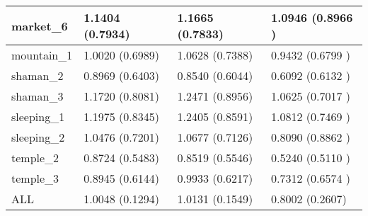 \documentclass[journal]{IEEEtran}
\begin{document}
\begin{table}
\begin{center}
\begin{tabular}{|l|l|l|l|}
\hline
market\_6 & 1.1404 \scriptsize(0.7934)& 1.1665 \scriptsize(0.7833) & 1.0946 \scriptsize(0.8966 )\\
\hline
mountain\_1 & 1.0020 \scriptsize(0.6989)& 1.0628 \scriptsize(0.7388)& 0.9432 \scriptsize(0.6799 ) \\
\hline
shaman\_2 & 0.8969 \scriptsize(0.6403)& 0.8540 \scriptsize(0.6044)& 0.6092 \scriptsize(0.6132 ) \\
\hline
shaman\_3 & 1.1720 \scriptsize(0.8081)& 1.2471 \scriptsize(0.8956)& 1.0625 \scriptsize(0.7017 ) \\
\hline
sleeping\_1 & 1.1975 \scriptsize(0.8345)& 1.2405 \scriptsize(0.8591)& 1.0812 \scriptsize(0.7469 ) \\
\hline
sleeping\_2 & 1.0476 \scriptsize(0.7201)& 1.0677 \scriptsize(0.7126)& 0.8090 \scriptsize(0.8862 ) \\
\hline
temple\_2 & 0.8724 \scriptsize(0.5483)& 0.8519 \scriptsize(0.5546)& 0.5240 \scriptsize(0.5110 ) \\
\hline
temple\_3 & 0.8945 \scriptsize(0.6144)& 0.9933 \scriptsize(0.6217)& 0.7312 \scriptsize(0.6574 ) \\
\hline 
\hline
ALL & 1.0048 \scriptsize(0.1294)& 1.0131 \scriptsize(0.1549) & 0.8002 \scriptsize(0.2607) \\
\hline
\end{tabular}
\label{tab:motion}
\end{center}
\vspace{-5mm}
\end{table}

\vspace{-3mm}
\end{document}
